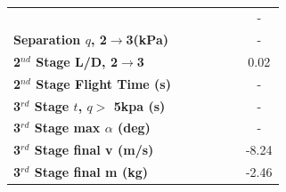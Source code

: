 \begin{table}[ht!]
\begin{tabular}{l c c c c c c}
		& \secondthirdSeparationgammaCdNinetyNoReturn
		& \secondthirdSeparationgammaCdNinetyFiveNoReturn
		& \secondthirdSeparationgammaCdStandardNoReturn
		& \secondthirdSeparationgammaCdOneHundredFiveNoReturn
		& \secondthirdSeparationgammaCdOneHundredTenNoReturn
		& -
		\\
		\textbf{Separation $q$, 2$\rightarrow$3(kPa)}
		& \secondthirdSeparationqCdNinetyNoReturn
		& \secondthirdSeparationqCdNinetyFiveNoReturn
		& \secondthirdSeparationqCdStandardNoReturn
		& \secondthirdSeparationqCdOneHundredFiveNoReturn
		& \secondthirdSeparationqCdOneHundredTenNoReturn
		& -
		\\
		\textbf{2$^{nd}$ Stage L/D, 2$\rightarrow$3}
		& \secondthirdSeparationLDCdNinetyNoReturn
		& \secondthirdSeparationLDCdNinetyFiveNoReturn
		& \secondthirdSeparationLDCdStandardNoReturn
		& \secondthirdSeparationLDCdOneHundredFiveNoReturn
		& \secondthirdSeparationLDCdOneHundredTenNoReturn
		&0.02
		\\
		\textbf{2$^{nd}$ Stage Flight Time (s)}
		& \secondFlightTimeCdNinetyNoReturn
		& \secondFlightTimeCdNinetyFiveNoReturn
		& \secondFlightTimeCdStandardNoReturn
		& \secondFlightTimeCdOneHundredFiveNoReturn
		& \secondFlightTimeCdOneHundredTenNoReturn
		& -
		\\
		\textbf{3$^{rd}$ Stage $t$, $q >$ 5kpa (s)}
		& \thirdqOverFiveCdNinetyNoReturn
		& \thirdqOverFiveCdNinetyFiveNoReturn
		& \thirdqOverFiveCdStandardNoReturn
		& \thirdqOverFiveCdOneHundredFiveNoReturn
		& \thirdqOverFiveCdOneHundredTenNoReturn
		& -
		\\
		\textbf{3$^{rd}$ Stage max $\alpha$ (deg)}
		& \thirdmaxAoACdNinetyNoReturn
		& \thirdmaxAoACdNinetyFiveNoReturn
		& \thirdmaxAoACdStandardNoReturn
		& \thirdmaxAoACdOneHundredFiveNoReturn
		& \thirdmaxAoACdOneHundredTenNoReturn
		& -
		\\
		\textbf{3$^{rd}$ Stage final v (m/s)}
		& \thirdcircvCdNinetyNoReturn
		& \thirdcircvCdNinetyFiveNoReturn
		& \thirdcircvCdStandardNoReturn
		& \thirdcircvCdOneHundredFiveNoReturn
		& \thirdcircvCdOneHundredTenNoReturn
		&-8.24
		\\
		\textbf{3$^{rd}$ Stage final m (kg)}
		& \thirdcircmCdNinetyNoReturn
		& \thirdcircmCdNinetyFiveNoReturn
		& \thirdcircmCdStandardNoReturn
		& \thirdcircmCdOneHundredFiveNoReturn
		& \thirdcircmCdOneHundredTenNoReturn
		&-2.46
		\\
		\hline 
	\end{tabular} 
	\caption{}
	\label{tab:DragVariationNoReturn}
\end{table}


